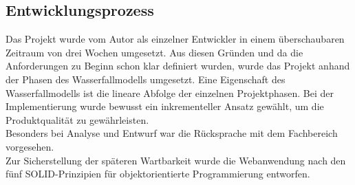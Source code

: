 \subsection{Entwicklungsprozess}
\label{sec:Entwicklungsprozess}
Das Projekt wurde vom Autor als einzelner Entwickler in einem überschaubaren Zeitraum 
von drei Wochen umgesetzt. Aus diesen Gründen und da die Anforderungen zu Beginn schon
klar definiert wurden, wurde das Projekt anhand der Phasen des Wasserfallmodells umgesetzt. 
Eine Eigenschaft des Wasserfallmodells ist die lineare Abfolge der einzelnen Projektphasen.
Bei der Implementierung wurde bewusst ein inkrementeller Ansatz gewählt, um die Produktqualität
zu gewährleisten.\\
Besonders bei Analyse und Entwurf war die Rücksprache mit dem Fachbereich vorgesehen.\\
Zur Sicherstellung der späteren Wartbarkeit wurde die Webanwendung nach den fünf SOLID-Prinzipien
für objektorientierte Programmierung entworfen.\\ 

\clearpage
